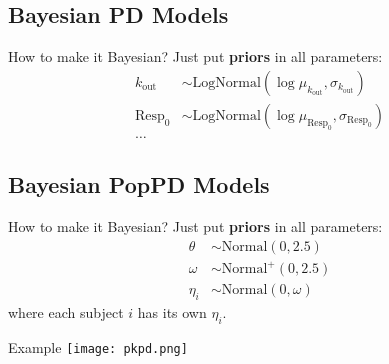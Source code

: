 \subsection{Bayesian PD Models}
\begin{frame}{How to make it Bayesian?}
    Just put \textbf{priors} in all parameters:
    $$
        \begin{aligned}
            k_{\text{out}} & \sim \text{LogNormal}(\log{\mu_{k_{\text{out}}}}, \sigma_{k_{\text{out}}}) \\
            \text{Resp}_0  & \sim \text{LogNormal}(\log{\mu_{\text{Resp}_0}}, \sigma_{\text{Resp}_0})   \\
            \ldots
        \end{aligned}
    $$
\end{frame}

\subsection{Bayesian PopPD Models}
\begin{frame}{How to make it Bayesian?}
    Just put \textbf{priors} in all parameters:
    $$
        \begin{aligned}
            \theta   & \sim \text{Normal}(0, 2.5)  \\
            \omega   & \sim \text{Normal}^+(0, 2.5)  \\
            \eta_{i} & \sim \text{Normal}(0, \omega)
        \end{aligned}
    $$
    \vfill
    where each subject $i$ has its own $\eta_i$.
\end{frame}

\begin{frame}{Example}
    \centering
    \texttt{[image: pkpd.png]}
\end{frame}
